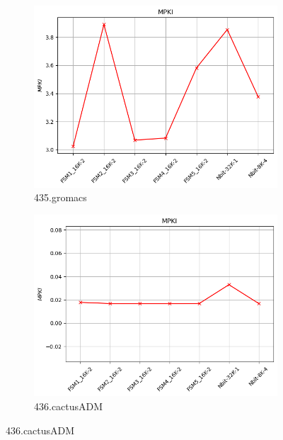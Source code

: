\documentclass{article}
\begin{document}
\begin{figure}[H]
    \vspace{0.5cm} %

    \begin{subfigure}[b]{0.45\textwidth}
        \includegraphics[width=\textwidth]{figures/5_3_c/435.gromacs.cslab_branch_preds_ref.out.png}
        \caption{435.gromacs}
        \label{fig:plot39}
    \end{subfigure}
    \hfill
    \begin{subfigure}[b]{0.45\textwidth}
        \includegraphics[width=\textwidth]{figures/5_3_c/436.cactusADM.cslab_branch_preds_ref.out.png}
        \caption{436.cactusADM}
        \label{fig:plot40}
    \end{subfigure}


\end{figure}
\end{document}
